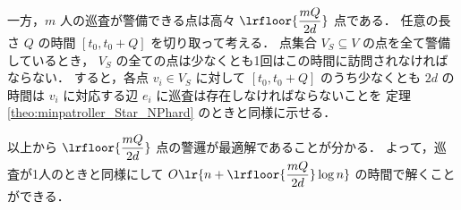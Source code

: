 一方，$m$ 人の巡査が警備できる点は高々 $\lrfloor{\dfrac{mQ}{2d}}$ 点である．
任意の長さ $Q$ の時間 $[t_0, t_0 + Q]$ を切り取って考える．
点集合 $V_S \subseteq V$ の点を全て警備しているとき，
$V_S$ の全ての点は少なくとも1回はこの時間に訪問されなければならない．
すると，各点 $v_i \in V_S$ に対して
$[t_0, t_0 + Q]$ のうち少なくとも $2d$ の時間は
$v_i$ に対応する辺 $e_i$ に巡査は存在しなければならないことを
定理 \ref{theo:minpatroller_Star_NPhard} のときと同様に示せる．



以上から $\lrfloor{\dfrac{mQ}{2d}}$ 点の警邏が最適解であることが分かる．
よって，巡査が1人のときと同様にして
$O\lr{n + \lrfloor{\dfrac{mQ}{2d}} \log n}$ の時間で解くことができる．






